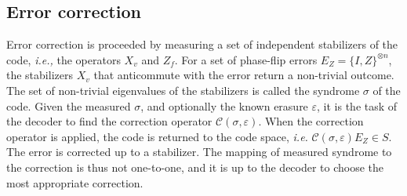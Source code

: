 \subsection{Error correction}
Error correction is proceeded by measuring a set of independent stabilizers of the code, \emph{i.e.,} the operators $X_v$ and $Z_f$. For a set of phase-flip errors $E_Z = \{I,Z\}^{\otimes n}$, the stabilizers $X_v$ that anticommute with the error return a non-trivial outcome. The set of non-trivial eigenvalues of the stabilizers is called the syndrome $\sigma$ of the code. Given the measured $\sigma$, and optionally the known erasure $\varepsilon$, it is the task of the decoder to find the correction operator $\mathcal{C}(\sigma, \varepsilon)$. When the correction operator is applied, the code is returned to the code space, \emph{i.e.} $\mathcal{C}(\sigma, \varepsilon)E_Z \in S$. The error is corrected up to a stabilizer. The mapping of measured syndrome to the correction is thus not one-to-one, and it is up to the decoder to choose the most appropriate correction. 